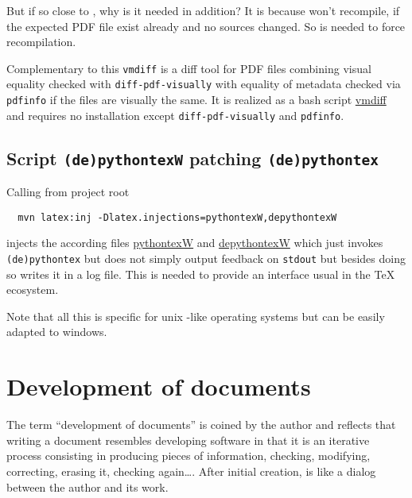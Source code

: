 But if  so close to , 
why is it needed in addition? 
It is because  won't recompile, if the expected PDF file exist already 
and no sources changed. 
So  is needed to force recompilation. 
\medskip

Complementary to this \texttt{vmdiff} is a diff tool for PDF files 
combining visual equality checked with \texttt{diff-pdf-visually} 
with equality of metadata checked via \texttt{pdfinfo} 
if the files are visually the same. 
It is realized as a bash script \href{\urlSite fromMain/ntlatex}{vmdiff} and requires no installation 
except \texttt{diff-pdf-visually} and \texttt{pdfinfo}. 

\subsection{Script \texttt{(de)pythontexW} patching \texttt{(de)pythontex} }%
\label{subsec:pythontexW}

Calling from project root 
%
\begin{Verbatim}
  mvn latex:inj -Dlatex.injections=pythontexW,depythontexW
\end{Verbatim}
%
injects the according files 
\href{\urlSite fromMain/pythontexW}{pythontexW} and 
\href{\urlSite fromMain/depythontexW}{depythontexW}
which just invokes \texttt{(de)pythontex} %
but does not simply output feedback on \texttt{stdout}
but besides doing so writes it in a log file. 
This is needed to provide an interface usual in the \TeX{} ecosystem. 

Note that all this is specific for unix -like operating systems 
but can be easily adapted to windows. 

\section{Development of documents}\label{sec:devel}

The term ``development of documents'' is coined by the author 
and reflects that writing a document 
resembles developing software 
in that it is an iterative process consisting in producing pieces of information, 
checking, modifying, correcting, erasing it, checking again\dots. 
After initial creation, is like a dialog between the author and its work. 


